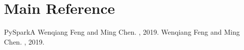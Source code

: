 \documentclass[letterpaper,12pt,english]{sphinxmanual}
\begin{document}
\chapter{Main Reference}
\label{\detokenize{reference:main-reference}}\label{\detokenize{reference:reference}}\label{\detokenize{reference::doc}}
\begin{sphinxthebibliography}{PySparkA}
Wenqiang Feng and Ming Chen. , 2019.
Wenqiang Feng and Ming Chen. , 2019.
\end{sphinxthebibliography}



\renewcommand{\indexname}{Index}
\printindex
\end{document}
